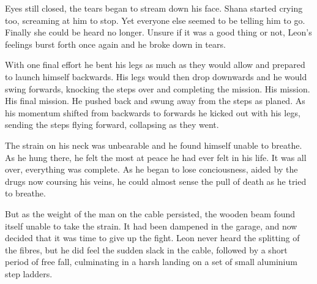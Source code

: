 Eyes still closed, the tears began to stream down his face.  Shana started crying too, screaming at him to stop.  Yet everyone else seemed to be telling him to go.  Finally she could be heard no longer.  Unsure if it was a good thing or not, Leon's feelings burst forth once again and he broke down in tears.  

With one final effort he bent his legs as much as they would allow and prepared to launch himself backwards.  His legs would then drop downwards and he would swing forwards, knocking the steps over and completing the mission.  His mission.  His final mission.  He pushed back and swung away from the steps as planed.  As his momentum shifted from backwards to forwards he kicked out with his legs, sending the steps flying forward, collapsing as they went.  

The strain on his neck was unbearable and he found himself unable to breathe.  As he hung there, he felt the most at peace he had ever felt in his life.  It was all over, everything was complete.  As he began to lose conciousness, aided by the drugs now coursing his veins, he could almost sense the pull of death as he tried to breathe.  

But as the weight of the man on the cable persisted, the wooden beam found itself unable to take the strain.  It had been dampened in the garage, and now decided that it was time to give up the fight.  Leon never heard the splitting of the fibres, but he did feel the sudden slack in the cable, followed by a short period of free fall, culminating in a harsh landing on a set of small aluminium step ladders.  





